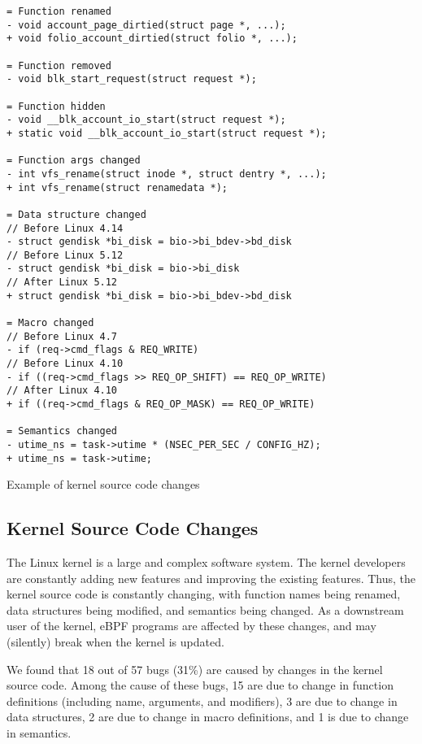 \begin{listing}[t]
\begin{verbatim}
= Function renamed
- void account_page_dirtied(struct page *, ...);
+ void folio_account_dirtied(struct folio *, ...);

= Function removed
- void blk_start_request(struct request *);

= Function hidden
- void __blk_account_io_start(struct request *);
+ static void __blk_account_io_start(struct request *);

= Function args changed
- int vfs_rename(struct inode *, struct dentry *, ...);
+ int vfs_rename(struct renamedata *);

= Data structure changed
// Before Linux 4.14
- struct gendisk *bi_disk = bio->bi_bdev->bd_disk
// Before Linux 5.12
- struct gendisk *bi_disk = bio->bi_disk
// After Linux 5.12
+ struct gendisk *bi_disk = bio->bi_bdev->bd_disk

= Macro changed
// Before Linux 4.7
- if (req->cmd_flags & REQ_WRITE)
// Before Linux 4.10
- if ((req->cmd_flags >> REQ_OP_SHIFT) == REQ_OP_WRITE)
// After Linux 4.10
+ if ((req->cmd_flags & REQ_OP_MASK) == REQ_OP_WRITE)

= Semantics changed
- utime_ns = task->utime * (NSEC_PER_SEC / CONFIG_HZ);
+ utime_ns = task->utime;
\end{verbatim}
\caption{Example of kernel source code changes}
\label{fig:kernel_source_code_changes}
\end{listing}


\subsection{Kernel Source Code Changes}
The Linux kernel is a large and complex software system.
The kernel developers are constantly adding new features and improving the existing features.
Thus, the kernel source code is constantly changing, with function names being renamed, data structures being modified, and semantics being changed.
As a downstream user of the kernel, eBPF programs are affected by these changes, and may (silently) break when the kernel is updated.

We found that 18 out of 57 bugs (31\%) are caused by changes in the kernel source code.
Among the cause of these bugs, 15 are due to change in function definitions (including name, arguments, and modifiers), 3 are due to change in data structures, 2 are due to change in macro definitions, and 1 is due to change in semantics. 

